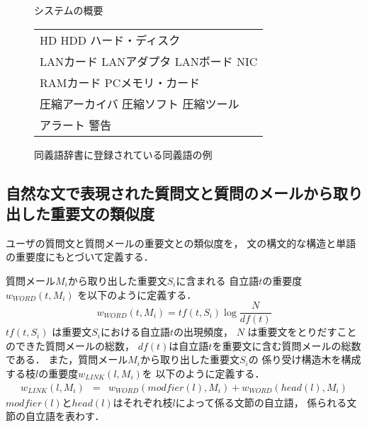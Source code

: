 \begin{description}
\begin{figure}[t]
 \begin{center}
  
  \caption{システムの概要}
  \label{fig:システムの概要}
 \end{center}
\end{figure}

   \begin{figure}[t]
    \begin{center}    
     {\small
     \begin{tabular}{|l|}
     \hline
      HD HDD ハード・ディスク\\
     LANカード LANアダプタ LANボード NIC\\
     RAMカード PCメモリ・カード\\
     圧縮アーカイバ 圧縮ソフト 圧縮ツール\\
     アラート 警告\\
     \hline
     \end{tabular}
     }
     \caption{同義語辞書に登録されている同義語の例}
     \label{fig:同義語辞書に登録されている同義語の例}
    \end{center}
   \end{figure}



\end{description}


 \subsection{自然な文で表現された質問文と質問のメールから取り出した重要文の類似度}
 \label{sec:自然な文で表現された質問文と質問のメールから取り出した重要文の類似度}


 ユーザの質問文と質問メールの重要文との類似度を，
 文の構文的な構造と単語の重要度にもとづいて定義する．

  質問メール$M_{i}$から取り出した重要文$S_{i}$に含まれる
  自立語$t$の重要度$w_{WORD}(t, M_{i})$ を以下のように定義する．
  \[ 
  w_{WORD} (t, M_{i}) =  tf(t, S_{i}) \log\frac{N}{df(t)}
  \]
  $tf(t, S_{i})$ は重要文$S_{i}$における自立語$t$の出現頻度，
  $N$ は重要文をとりだすことのできた質問メールの総数，
  $df(t)$は自立語$t$を重要文に含む質問メールの総数である．
  また，質問メール$M_{i}$から取り出した重要文$S_{i}$の
  係り受け構造木を構成する枝$l$の重要度$w_{LINK}(l, M_{i})$を
  以下のように定義する．
  \begin{eqnarray*} 
   w_{LINK} (l, M_{i}) & = & w_{WORD} (modfier(l), M_{i}) 
    + w_{WORD} (head(l), M_{i}) 
  \end{eqnarray*}
  $modfier(l)$と$head(l)$はそれぞれ枝$l$によって係る文節の自立語，
  係られる文節の自立語を表わす．

